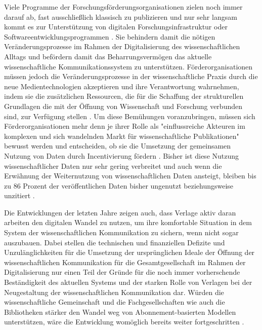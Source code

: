 Viele Programme der Forschungsförderungsorganisationen zielen noch immer darauf ab, fast ausschließlich klassisch zu publizieren und nur sehr langsam kommt es zur Unterstützung von digitalen Forschungsinfrastruktur oder Softwareentwicklungsprogrammen \cite{hey_2015_open}. Sie behindern damit die nötigen Veränderungsprozesse im Rahmen der Digitalisierung des wissenschaftlichen Alltags und befördern damit das Beharrungsvermögen das aktuelle wissenschaftliche  Kommunikationssystem zu unterstützen. Förderorganisationen müssen jedoch die Veränderungsprozesse in der wissenschaftliche Praxis durch die neue Medientechnologien akzeptieren und ihre Verantwortung wahrnehmen, indem sie die zusätzlichen Ressourcen, die für die Schaffung der strukturellen Grundlagen die mit der Öffnung von Wissenschaft und Forschung verbunden sind, zur Verfügung stellen \cite{mennes_2013_making_os} \cite{patlak_2010_open}. Um diese Bemühungen voranzubringen, müssen sich Förderorganisationen mehr denn je ihrer Rolle als "einflussreiche  Akteuren  im  komplexen und  sich  wandelnden  Markt  für  wissenschaftliche  Publikationen" \cite{wein_2010_erwerbung} bewusst werden und entscheiden, ob sie die Umsetzung der gemeinsamen Nutzung von Daten durch Incentivierung fördern \cite{mennes_2013_making_os}. Bisher ist diese Nutzung wissenschaftlicher Daten nur sehr gering verbreitet und auch wenn die Erwähnung der Weiternutzung von wissenschaftlichen Daten ansteigt, bleiben bis zu 86 Prozent der veröffentlichen Daten bisher ungenutzt beziehungsweise unzitiert \cite{peters_2015_research}.

Die Entwicklungen der letzten Jahre zeigen auch, dass Verlage aktiv daran arbeiten den digitalen Wandel zu nutzen, um ihre komfortable Situation in dem System der wissenschaftlichen Kommunikation zu sichern, wenn nicht sogar auszubauen. Dabei stellen die technischen und finanziellen Defizite und Unzulänglichkeiten für die Umsetzung der ursprünglichen Ideale der Öffnung der wissenschaftlichen Kommunikation für die Gesamtgesellschaft im Rahmen der Digitalisierung nur einen Teil der Gründe für die noch immer vorherschende Beständigkeit des aktuellen Systems und der starken Rolle von Verlagen bei der Neugestaltung der wissenschaftlichen Kommunikation dar. Würden die wissenschaftliche Gemeinschaft und die Fachgesellschaften wie auch die Bibliotheken stärker den Wandel weg von Abonnement-basierten Modellen unterstützen, wäre die Entwicklung womöglich bereits weiter fortgeschritten \cite{nosek_2012_scientific}.

